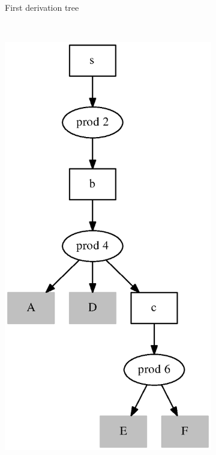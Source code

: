 \documentclass{acm_proc_article-sp}
\begin{document}
\begin{figure}[h!]
\begin{center}
\begin{subfigure}{0.2\textwidth}
    		\caption{First derivation tree}
    \label{tree_sql_1}
    \end{subfigure}
    ~
    \begin{subfigure}{0.2\textwidth}      
       \includegraphics[scale=0.3]{graphs/SPPF_proof_snd.eps}
    

\end{subfigure}
\end{center}
\end{figure}
\end{document}
